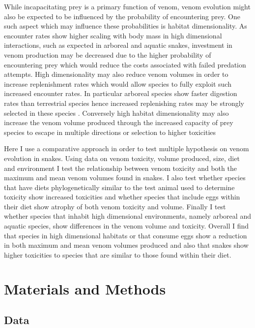 While incapacitating prey is a primary function of venom, venom evolution might also be expected to be influenced by the probability of encountering prey. One such aspect which may influence these probabilities is habitat dimensionality. As encounter rates show higher scaling with body mass in high dimensional interactions, such as expected in arboreal and aquatic snakes, investment in venom production may be decreased due to the higher probability of encountering prey which would reduce the costs associated with failed predation attempts. High dimensionality may also reduce venom volumes in order to increase replenishment rates which would allow species to fully exploit such increased encounter rates. In particular arboreal species show faster digestion rates than terrestrial species hence increased replenishing rates may be strongly selected in these species \citep{lillywhite2002patterns}. Conversely high habitat dimensionality may also increase the venom volume produced through the increased capacity of prey species to escape in multiple directions or selection to higher toxicities \citep{healy2014ecology,moller2010up} 

Here I use a comparative approach in order to test multiple hypothesis on venom evolution in snakes. Using data on venom toxicity, volume produced, size, diet and environment I test the relationship between venom toxicity and both the maximum and mean venom volumes found in snakes. I also test whether species that have diets phylogenetically similar to the test animal used to determine toxicity show increased toxicities and whether species that include eggs within their diet show atrophy of both venom toxicity and volume. Finally I test whether species that inhabit high dimensional environments, namely arboreal and aquatic species, show differences in the venom volume and toxicity. Overall I find that species in high dimensional habitats or that consume eggs show a reduction in both maximum and mean venom volumes produced and also that snakes show higher toxicities to species that are similar to those found within their diet.

\section{Materials and Methods}
\subsection{Data}

